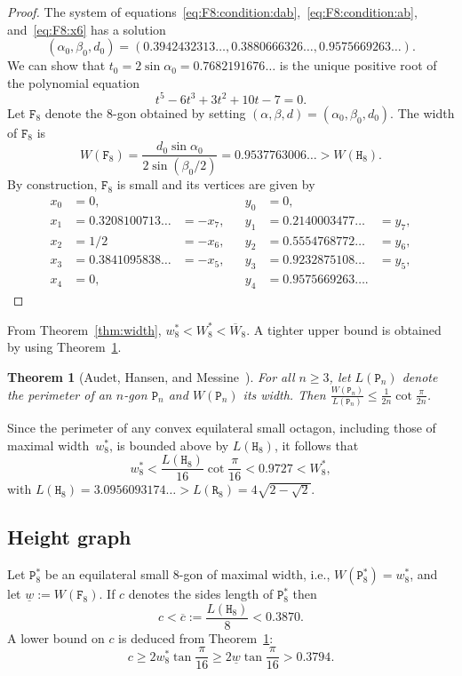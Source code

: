 \documentclass[a4paper,12pt]{article}
\theoremstyle{definition}
\theoremstyle{plain}
\newtheorem{theorem}{Theorem}
\newcommand{\ub}[1]{\overline{#1}}
\newcommand{\lb}[1]{\underline{#1}}
\newcommand{\geo}[1]{\mathtt{#1}}
\begin{document}
\begin{proof}
The system of equations~\eqref{eq:F8:condition:dab},~\eqref{eq:F8:condition:ab}, and~\eqref{eq:F8:x6} has a solution
\[
(\alpha_0,\beta_0,d_0) = (0.3942432313\ldots, 0.3880666326\ldots, 0.9575669263\ldots).
\]
We can show that $t_0 = 2\sin \alpha_0 = 0.7682191676\ldots$ is the unique positive root of the polynomial equation
\[
t^5-6t^3+3t^2+10t-7=0.
\]
Let $\geo{F}_8$ denote the $8$-gon obtained by setting $(\alpha,\beta,d) = (\alpha_0,\beta_0,d_0)$. The width of $\geo{F}_8$ is
\[
W(\geo{F}_8) = \frac{d_0\sin \alpha_0}{2\sin (\beta_0/2)} = 0.9537763006\ldots > W(\geo{H}_8).
\]
By construction, $\geo{F}_8$ is small and its vertices are given by
\[
\begin{aligned}
	x_0 &= 0,&&&y_0 &= 0,\\
	x_1 &= 0.3208100713\ldots &= -x_7, &&y_1 &= 0.2140003477\ldots &= y_7,\\
	x_2 &= 1/2 &= -x_6, &&y_2 &= 0.5554768772\ldots &= y_6,\\
	x_3 &= 0.3841095838\ldots &= -x_5, &&y_3 &= 0.9232875108\ldots &= y_5,\\
	x_4 &= 0, &&&y_4 &= 0.9575669263\ldots.
\end{aligned}
\]
\end{proof}

From Theorem~\ref{thm:width}, $w_8^* < W_8^* < \ub{W}_8$. A tighter upper bound is obtained by using Theorem~\ref{thm:width:perimeter}.

\begin{theorem}[Audet, Hansen, and Messine~\cite{audet2009b}]\label{thm:width:perimeter}
	For all $n \ge 3$, let $L(\geo{P}_n)$ denote the perimeter of an $n$-gon $\geo{P}_n$ and $W(\geo{P}_n)$ its width. Then $\frac{W(\geo{P}_n)}{L(\geo{P}_n)} \le \frac{1}{2n} \cot \frac{\pi}{2n}$.
\end{theorem}

Since the perimeter of any convex equilateral small octagon, including those of maximal width~$w_8^*$, is bounded above by $L(\geo{H}_8)$, it follows that
\[
w_8^* < \frac{L(\geo{H}_8)}{16} \cot \frac{\pi}{16} < 0.9727 < W_8^*,
\]
with $L(\geo{H}_8) = 3.0956093174\ldots > L(\geo{R}_8) = 4\sqrt{2-\sqrt{2}}$.

\subsection{Height graph}
Let $\geo{P}_8^*$ be an equilateral small $8$-gon of maximal width, i.e., $W(\geo{P}_8^*) = w_8^*$, and let $\lb{w} := W(\geo{F}_8)$. If $c$ denotes the sides length of $\geo{P}_8^*$ then
\[
c < \ub{c} := \frac{L(\geo{H}_8)}{8} < 0.3870.
\]
A lower bound on $c$ is deduced from Theorem~\ref{thm:width:perimeter}:
\[
c \ge 2w_8^* \tan \frac{\pi}{16} \ge 2\lb{w} \tan \frac{\pi}{16} > 0.3794.
\]
\end{document}
